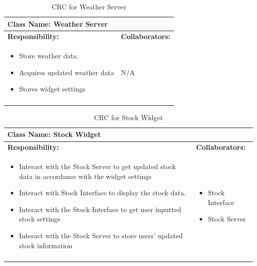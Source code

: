 \documentclass[]{article}
\begin{document}
\begin{longtable}{| p{} | p{} |}
	\hline
	\multicolumn{2}{|l|}{\textbf{Class Name: Weather Server}} \\
	\hline
	\textbf{Responsibility:} & \textbf{Collaborators:} \\
	\hline
	\begin{itemize}
		\item Store weather data.
		\item Acquires updated weather data
		\item Stores widget settings
    \end{itemize} & \newline \newline  N/A \\
	\hline
	\caption{CRC for Weather Server}
\end{longtable}
\newpage
\begin{longtable}{| p{} | p{} |}
	\hline
	\multicolumn{2}{|l|}{\textbf{Class Name: Stock Widget}} \\
	\hline
	\textbf{Responsibility:} & \textbf{Collaborators:} \\
	\hline
	\begin{itemize}
		\item Interact with the Stock Server to get updated stock data in accordance with the widget settings
		\item Interact with Stock Interface to display the stock data.
		\item Interact with the Stock Interface to get user inputted stock settings
		\item Interact with the Stock Server to store users' updated stock information 
    \end{itemize} & 
	\begin{itemize}
		\item Stock Interface
        \item Stock Server
	\end{itemize} \\
	\hline
	\caption{CRC for Stock Widget}
\end{longtable}
\end{document}

